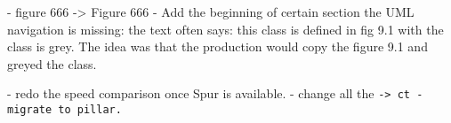- figure 666 -> Figure 666
- Add the beginning of certain section the UML navigation is missing: 
the text often says: this class is defined in fig 9.1 with the class is grey. The idea was that the production would copy the figure 9.1 and greyed the class.

- redo the speed comparison once Spur is available.
- change all the \tt -> ct 
- migrate to pillar.
